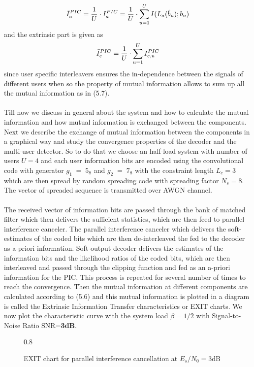 \begin{equation}
\bar{I}_a^{PIC}=\frac{\hbox{$1$}}{\hbox{$U$}}\cdot I_a^{PIC}=\frac{\hbox{$1$}}{\hbox{$U$}}\cdot \sum\limits_{u=1}^{U}I(L_a(\hat{b}_u);b_u)
\end{equation}
and the extrinsic part is given as 
\begin{equation}
\bar{I}_e^{PIC}=\frac{\hbox{$1$}}{\hbox{$U$}}\cdot \sum\limits_{u=1}^{U}I_{e,u}^{PIC}
\end{equation}
since user specific interleavers ensures the in-dependence between the signals of different users when so the property of mutual information allows to sum up all the mutual information as in (5.7).\\ \\
Till now we discuss in general about the system and how to calculate the mutual information and how mutual information is exchanged between the components. Next we describe the exchange of mutual information between the components in a graphical way and study the convergence properties of the decoder and the multi-user detector. So to do that we choose an half-load system with number of users $U=4$ and each user information bits are encoded using the convolutional code with generator $g_1\;=\;5_8$ and $g_2\;=\;7_8$ with the constraint length $L_c=3$ which are then spread by random spreading code with spreading factor $N_s=8$. The vector of spreaded sequence is transmitted over AWGN channel. \\ \\
The received vector of information bits are passed through the bank of matched filter which then delivers the sufficient statistics, which are then feed to parallel interference canceler. The parallel interference canceler which delivers the soft-estimates of the coded bits which are then de-interleaved the fed to the decoder as a-priori information. Soft-output decoder delivers the estimates of the information bits and the likelihood ratios of the coded bits, which are then interleaved and passed through the clipping function and fed as an a-priori information for the PIC. This process is repeated for several number of times to reach the convergence. Then the mutual information at different components are calculated according to (5.6) and this mutual information is plotted in a diagram is called the Extrinsic Information Transfer characteristics or EXIT charts.
\newpage
We now plot the characteristic curve with the system load $\beta=1/2$ with Signal-to-Noise Ratio SNR=\textbf{3dB}.
\begin{figure*}[htb]
\centerline{  {0.8}}
\caption{EXIT chart for parallel interference cancellation at $E_s/N_0=3$dB}
\end{figure*} \\
